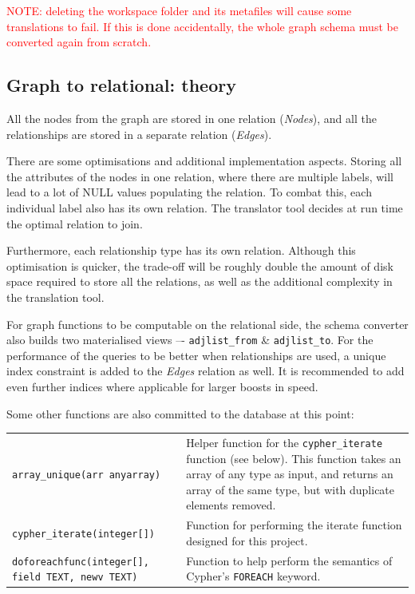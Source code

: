 \documentclass[letterpaper]{ltxdoc}
\begin{document}
\medskip

\textcolor{red}{NOTE: deleting the workspace folder and its metafiles will cause some translations to fail. If this is done accidentally, the whole graph schema must be converted again from scratch.}


\subsection{Graph to relational: theory}
\label{ssec:grreltheory}
All the nodes from the graph are stored in one relation (\emph{Nodes}), and all the relationships are stored in a separate relation (\emph{Edges}).

There are some optimisations and additional implementation aspects. Storing all the attributes of the nodes in one relation, where there are multiple labels, will lead to a lot of NULL values populating the relation. To combat this, each individual label also has its own relation. The translator tool decides at run time the optimal relation to join.

Furthermore, each relationship type has its own relation. Although this optimisation is quicker, the trade-off will be roughly double the amount of disk space required to store all the relations, as well as the additional complexity in the translation tool.

For graph functions to be computable on the relational side, the schema converter also builds two materialised views –- \texttt{adjlist\_from} \& \texttt{adjlist\_to}. For the performance of the queries to be better when relationships are used, a unique index constraint is added to the \emph{Edges} relation as well. It is recommended to add even further indices where applicable for larger boosts in speed.

Some other functions are also committed to the database at this point:

\begin{center}
\begin{tabular}{ p{4.5cm} p{9cm} }
\texttt{array\_unique(arr anyarray)} & Helper function for the \texttt{cypher\_iterate} function (see below). This function takes an array of any type as input, and returns an array of the same type, but with duplicate elements removed. \\

\texttt{cypher\_iterate(integer[])} & Function for performing the iterate function designed for this project. \\

\texttt{doforeachfunc(integer[], field TEXT, newv TEXT)} & Function to help perform the semantics of Cypher’s \texttt{FOREACH} keyword.
\end{tabular}
\end{center}
\end{document}
